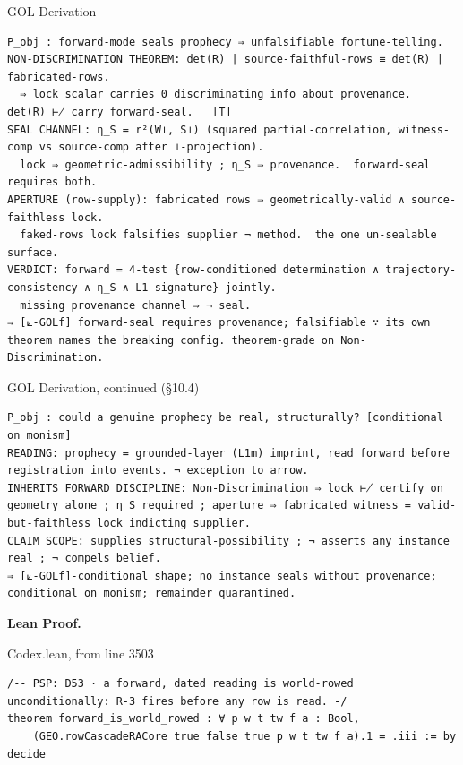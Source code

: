 \documentclass[10pt,twocolumn]{article}
\begin{document}
\begin{golbox}{GOL Derivation}
\begin{lstlisting}[style=golv]
P_obj : forward-mode seals prophecy ⇒ unfalsifiable fortune-telling.
NON-DISCRIMINATION THEOREM: det(R) | source-faithful-rows ≡ det(R) | fabricated-rows.
  ⇒ lock scalar carries 0 discriminating info about provenance.  det(R) ⊬ carry forward-seal.   [T]
SEAL CHANNEL: η_S = r²(W⟂, S⟂) (squared partial-correlation, witness-comp vs source-comp after ⊥-projection).
  lock ⇒ geometric-admissibility ; η_S ⇒ provenance.  forward-seal requires both.
APERTURE (row-supply): fabricated rows ⇒ geometrically-valid ∧ source-faithless lock.
  faked-rows lock falsifies supplier ¬ method.  the one un-sealable surface.
VERDICT: forward = 4-test {row-conditioned determination ∧ trajectory-consistency ∧ η_S ∧ L1-signature} jointly.
  missing provenance channel ⇒ ¬ seal.
⇒ [⟀-GOLf] forward-seal requires provenance; falsifiable ∵ its own theorem names the breaking config. theorem-grade on Non-Discrimination.
\end{lstlisting}
\end{golbox}

\begin{golbox}{GOL Derivation, continued (§10.4)}
\begin{lstlisting}[style=golv]
P_obj : could a genuine prophecy be real, structurally? [conditional on monism]
READING: prophecy = grounded-layer (L1m) imprint, read forward before registration into events. ¬ exception to arrow.
INHERITS FORWARD DISCIPLINE: Non-Discrimination ⇒ lock ⊬ certify on geometry alone ; η_S required ; aperture ⇒ fabricated witness = valid-but-faithless lock indicting supplier.
CLAIM SCOPE: supplies structural-possibility ; ¬ asserts any instance real ; ¬ compels belief.
⇒ [⟀-GOLf]-conditional shape; no instance seals without provenance; conditional on monism; remainder quarantined.
\end{lstlisting}
\end{golbox}

\textbf{Lean Proof.}

\begin{leanexcerpt}{Codex.lean, from line 3503}
\begin{lstlisting}[style=leanx,firstnumber=3503]
/-- PSP: D53 · a forward, dated reading is world-rowed unconditionally: R-3 fires before any row is read. -/
theorem forward_is_world_rowed : ∀ p w t tw f a : Bool,
    (GEO.rowCascadeRACore true false true p w t tw f a).1 = .iii := by decide
\end{lstlisting}
\end{leanexcerpt}
\end{document}
